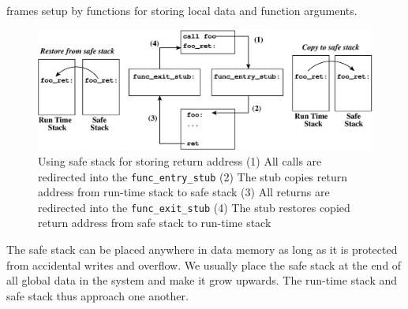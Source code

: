 frames setup by functions for storing local data and function
arguments.
%
\begin{figure}[htbp]
   \centering
   \includegraphics[width=5.3in, keepaspectratio=true]{figures/safe_stack.eps} 
   \caption[Using safe stack for storing return address]{Using safe
     stack for storing return address (1) All calls are redirected
     into the \texttt{func\_entry\_stub} (2) The stub copies return
     address from run-time stack to safe stack (3) All returns are
     redirected into the \texttt{func\_exit\_stub} (4) The stub
     restores copied return address from safe stack to run-time stack}
   \label{fig:safestack}
\end{figure}

The safe stack can be placed anywhere in data memory as long as it is
protected from accidental writes and overflow.
%
We usually place the safe stack at the end of all global data in the
system and make it grow upwards.
%
The run-time stack and safe stack thus approach one another.
%
%
%
%
%
%
%
